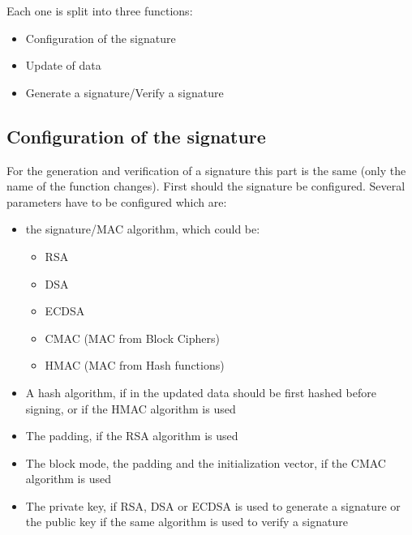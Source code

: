 Each one is split into three functions:
\begin{itemize}[noitemsep]
  \item Configuration of the signature
  \item Update of data
  \item Generate a signature/Verify a signature\newline
\end{itemize}


\subsection*{Configuration of the signature}
For the generation and verification of a signature this part is the same (only
the name of the function changes).
First should the signature be configured.
Several parameters have to be configured which are:
\begin{itemize}
  \item the signature/MAC algorithm, which could be:
  \begin{itemize}[noitemsep]
    \item RSA
    \item DSA
    \item ECDSA
    \item CMAC (MAC from Block Ciphers)
    \item HMAC (MAC from Hash functions)
  \end{itemize}
  \item A hash algorithm, if in the updated data should be first hashed before
  signing, or if the HMAC algorithm is used
  \item The padding, if the RSA algorithm is used
  \item The block mode, the padding and the initialization vector, if the CMAC
  algorithm is used
  \item The private key, if RSA, DSA or ECDSA is used to generate a signature or
  the public key if the same algorithm is used to verify a signature
\end{itemize}

